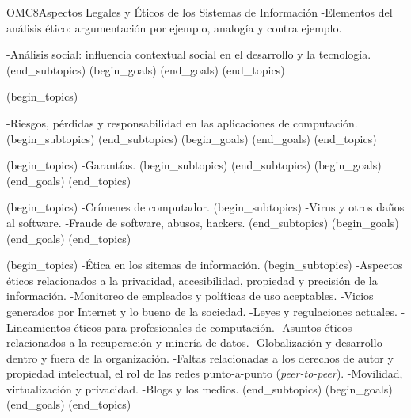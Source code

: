 \begin{BKL2}{OMC8}{Aspectos Legales y Éticos de los Sistemas de Información}
-Elementos del análisis ético: argumentación por ejemplo, analogía y contra ejemplo.

-Análisis social: influencia contextual social en el desarrollo y la tecnología.
(end_subtopics)
(begin_goals)
(end_goals)
(end_topics)

 

(begin_topics)

-Riesgos, pérdidas y responsabilidad en las aplicaciones de computación.
(begin_subtopics)
(end_subtopics)
(begin_goals)
(end_goals)
(end_topics)

 

(begin_topics)
-Garantías.
(begin_subtopics)
(end_subtopics)
(begin_goals)
(end_goals)
(end_topics)


(begin_topics)
-Crímenes de computador.
(begin_subtopics)
-Virus y otros daños al software.
-Fraude de software, abusos, hackers.
(end_subtopics)
(begin_goals)
(end_goals)
(end_topics)

(begin_topics)
-Ética en los sitemas de información.
(begin_subtopics)
-Aspectos éticos relacionados a la privacidad, accesibilidad, propiedad y precisión de la información.
-Monitoreo de empleados y políticas de uso aceptables.
-Vicios generados por Internet y lo bueno de la sociedad.
-Leyes y regulaciones actuales.
-Lineamientos éticos para profesionales de computación.
-Asuntos éticos relacionados a la recuperación y minería de datos.
-Globalización y desarrollo dentro y fuera de la organización.
-Faltas relacionadas a los derechos de autor y propiedad intelectual, el rol de las redes punto-a-punto (\emph{peer-to-peer}).
-Movilidad, virtualización y privacidad.
-Blogs y los medios.
(end_subtopics)
(begin_goals)
(end_goals)
(end_topics)

\end{BKL2}




